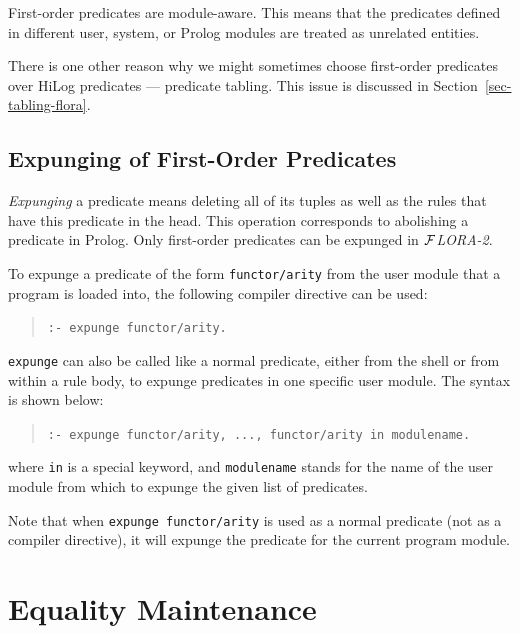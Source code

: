 \documentclass[11pt]{article}
\newcommand{\FLORA}{{\mbox{${\cal F}${\small\it LORA}\rm\emph{-2}}}\xspace}
\begin{document}
First-order predicates are module-aware. This means that the predicates
defined in different user, system, or Prolog modules are treated as
unrelated entities.

There is one other reason why we might sometimes choose first-order
predicates over HiLog predicates --- predicate tabling. This issue
is discussed in Section~\ref{sec-tabling-flora}.



\subsection{Expunging of First-Order Predicates}

\emph{Expunging} a predicate means deleting all of its tuples as well as
the rules that have this predicate in the head. This operation corresponds
to abolishing a predicate in Prolog. Only first-order predicates can be
expunged in \FLORA.

%
To expunge a predicate of the form {\tt functor/arity} from the user module
that a program is loaded into, the following compiler directive can be
used:
\begin{quote}
\verb!:- expunge functor/arity.!
\end{quote}

\noindent
{\tt expunge} can also be called like a normal predicate,
either from the shell or from within a rule body, to expunge
predicates in one specific user module. The syntax is shown below:
\begin{quote}
\verb!:- expunge functor/arity, ..., functor/arity in modulename.!
\end{quote}
where {\tt in} is a special keyword, and {\tt modulename} stands for the
name of the user module from which to expunge the given list of predicates.

Note that when {\tt expunge functor/arity} is used as a normal predicate
(not as a compiler directive), it will expunge the predicate for the
current program module.




\section{Equality Maintenance}\label{sec-eqmaintain}
\end{document}
